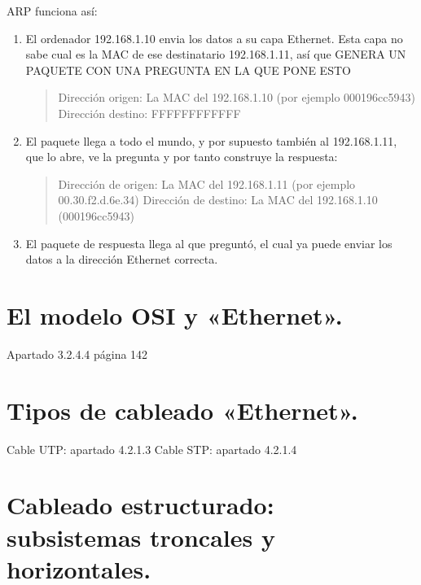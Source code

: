 \documentclass[letterpaper,10pt,spanish]{sphinxmanual}
\begin{document}
\sphinxAtStartPar
ARP funciona así:
\begin{enumerate}
%
\item {} 
\sphinxAtStartPar
El ordenador 192.168.1.10 envia los datos a su capa Ethernet. Esta capa no sabe cual es la MAC de ese destinatario 192.168.1.11, así que GENERA UN PAQUETE CON UNA PREGUNTA EN LA QUE PONE ESTO
\begin{quote}

\sphinxAtStartPar
Dirección origen: La MAC del 192.168.1.10 (por ejemplo  00\sphinxhyphen{}01\sphinxhyphen{}96\sphinxhyphen{}cc\sphinxhyphen{}59\sphinxhyphen{}43)
Dirección destino: FF\sphinxhyphen{}FF\sphinxhyphen{}FF\sphinxhyphen{}FF\sphinxhyphen{}FF\sphinxhyphen{}FF
\end{quote}

\item {} 
\sphinxAtStartPar
El paquete llega a todo el mundo, y por supuesto también al 192.168.1.11, que lo abre, ve la pregunta y por tanto construye la respuesta:
\begin{quote}

\sphinxAtStartPar
Dirección de origen: La MAC del 192.168.1.11 (por ejemplo 00.30.f2.d.6e.34)
Dirección de destino: La MAC del 192.168.1.10 (00\sphinxhyphen{}01\sphinxhyphen{}96\sphinxhyphen{}cc\sphinxhyphen{}59\sphinxhyphen{}43)
\end{quote}

\item {} 
\sphinxAtStartPar
El paquete de respuesta llega al que preguntó, el cual ya puede enviar los datos a la dirección Ethernet correcta.

\end{enumerate}


\section{El modelo OSI y «Ethernet».}
\label{\detokenize{t1_caracterizacion_redes/apuntes_t1:el-modelo-osi-y-ethernet}}
\sphinxAtStartPar
Apartado 3.2.4.4 página 142


\section{Tipos de cableado «Ethernet».}
\label{\detokenize{t1_caracterizacion_redes/apuntes_t1:tipos-de-cableado-ethernet}}
\sphinxAtStartPar
Cable UTP: apartado 4.2.1.3
Cable STP: apartado 4.2.1.4


\section{Cableado estructurado: subsistemas troncales y horizontales.}
\label{\detokenize{t1_caracterizacion_redes/apuntes_t1:cableado-estructurado-subsistemas-troncales-y-horizontales}}
\end{document}
